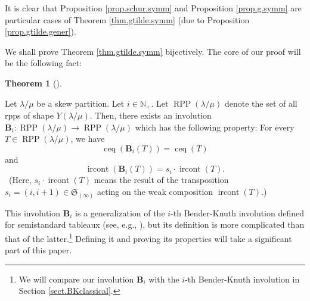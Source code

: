 \documentclass[numbers=enddot,12pt,final,onecolumn,notitlepage]{scrartcl}%
\theoremstyle{definition}
\newtheorem{theo}{Theorem}[section]
\newenvironment{theorem}[1][]
{\begin{theo}[#1]\begin{leftbar}}
{\end{leftbar}\end{theo}}
\begin{document}
It is clear that Proposition \ref{prop.schur.symm} and Proposition
\ref{prop.g.symm} are particular cases of Theorem \ref{thm.gtilde.symm} (due
to Proposition \ref{prop.gtilde.gener}).

We shall prove Theorem \ref{thm.gtilde.symm} bijectively. The core of our
proof will be the following fact:

\begin{theorem}
\label{thm.BK}Let $\lambda/\mu$ be a skew partition. Let $i\in\mathbb{N}_{+}$.
Let $\operatorname*{RPP}\left(  \lambda/\mu\right)  $ denote the set of all
rpps of shape $Y\left(  \lambda/\mu\right)  $. Then, there exists an
involution $\mathbf{B}_{i}:\operatorname*{RPP}\left(  \lambda/\mu\right)
\rightarrow\operatorname*{RPP}\left(  \lambda/\mu\right)  $ which has the
following property: For every $T\in\operatorname*{RPP}\left(  \lambda
/\mu\right)  $, we have%
\begin{equation}
\operatorname*{ceq}\left(  \mathbf{B}_{i}\left(  T\right)  \right)
=\operatorname*{ceq}\left(  T\right)  \label{eq.thm.BK.ceq}%
\end{equation}
and%
\begin{equation}
\operatorname*{ircont}\left(  \mathbf{B}_{i}\left(  T\right)  \right)
=s_{i}\cdot\operatorname*{ircont}\left(  T\right)  . \label{eq.thm.BK.ircont}%
\end{equation}
\footnotemark\ (Here,
$s_{i}\cdot\operatorname*{ircont}\left(  T\right)  $ means
the result of the transposition $s_{i}=\left(  i,i+1\right)  \in
\mathfrak{S}_{\left(  \infty\right)  }$ acting on the weak composition
$\operatorname*{ircont}\left(  T\right)  $.)
\end{theorem}

This involution $\mathbf{B}_{i}$ is a generalization of the $i$-th
Bender-Knuth involution defined for semistandard tableaux (see, e.g.,
\cite[proof of Proposition 2.11]{GriRei15}), but its definition is more
complicated than that of the latter.\footnote{We will compare our involution
$\mathbf{B}_{i}$ with the $i$-th Bender-Knuth involution in Section
\ref{sect.BKclassical}.} Defining it and proving its properties will take a
significant part of this paper.
\end{document}
